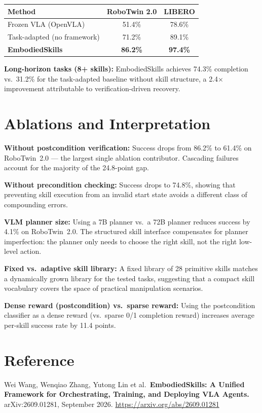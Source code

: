 \documentclass[10pt,twocolumn]{article}
\begin{document}
\begin{center}
\begin{tabular}{lcc}
\toprule
Method & RoboTwin 2.0 & LIBERO \\
\midrule
Frozen VLA (OpenVLA)        & 51.4\% & 78.6\% \\
Task-adapted (no framework) & 71.2\% & 89.1\% \\
\textbf{EmbodiedSkills}     & \textbf{86.2\%} & \textbf{97.4\%} \\
\bottomrule
\end{tabular}
\end{center}

\textbf{Long-horizon tasks (8+ skills):} EmbodiedSkills achieves 74.3\%
completion vs.\ 31.2\% for the task-adapted baseline without skill
structure, a 2.4$\times$ improvement attributable to verification-driven
recovery.

\section{Ablations and Interpretation}

\textbf{Without postcondition verification:} Success drops from 86.2\%
to 61.4\% on RoboTwin~2.0 --- the largest single ablation contributor.
Cascading failures account for the majority of the 24.8-point gap.

\textbf{Without precondition checking:} Success drops to 74.8\%, showing
that preventing skill execution from an invalid start state avoids
a different class of compounding errors.

\textbf{VLM planner size:} Using a 7B planner vs.\ a 72B planner reduces
success by 4.1\% on RoboTwin~2.0. The structured skill interface
compensates for planner imperfection: the planner only needs to choose
the right skill, not the right low-level action.

\textbf{Fixed vs.\ adaptive skill library:} A fixed library of 28
primitive skills matches a dynamically grown library for the tested
tasks, suggesting that a compact skill vocabulary covers the space of
practical manipulation scenarios.

\textbf{Dense reward (postcondition) vs.\ sparse reward:} Using the
postcondition classifier as a dense reward (vs.\ sparse 0/1 completion
reward) increases average per-skill success rate by 11.4 points.

\section*{Reference}

Wei Wang, Wenqiao Zhang, Yutong Lin et al.\
\textbf{EmbodiedSkills: A Unified Framework for Orchestrating,
Training, and Deploying VLA Agents.}
arXiv:2609.01281, September 2026.
\url{https://arxiv.org/abs/2609.01281}
\end{document}
